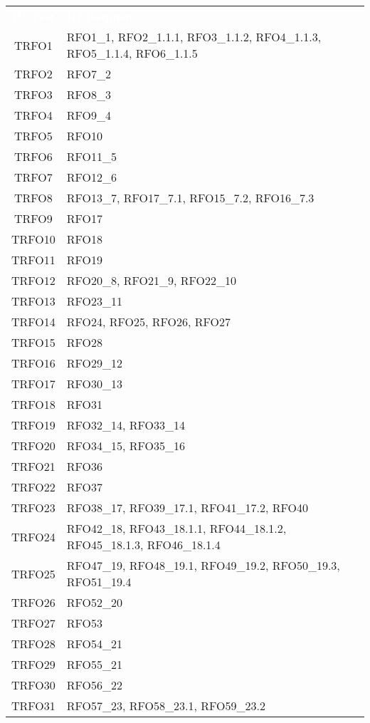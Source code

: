 \begin{longtable}{|c| C{13cm}|}
	\textcolor{white}{\textbf{ID Test}}&
	\textcolor{white}{\textbf{ID Requisito}}\label{tab:TestSistema2}\\
	TRFO1 & RFO1\_1, RFO2\_1.1.1, RFO3\_1.1.2, RFO4\_1.1.3, RFO5\_1.1.4, RFO6\_1.1.5\\ \hline
	TRFO2 & RFO7\_2\\ \hline
	TRFO3 & RFO8\_3\\ \hline
	TRFO4 & RFO9\_4\\ \hline
	TRFO5 & RFO10\\ \hline
	TRFO6 & RFO11\_5\\ \hline
	TRFO7 & RFO12\_6\\ \hline
	TRFO8 & RFO13\_7, RFO17\_7.1, RFO15\_7.2, RFO16\_7.3\\ \hline
	TRFO9 & RFO17\\ \hline
	TRFO10 & RFO18\\ \hline
	TRFO11 & RFO19\\ \hline
	TRFO12 & RFO20\_8, RFO21\_9, RFO22\_10\\ \hline
	TRFO13 & RFO23\_11\\ \hline
	TRFO14 & RFO24, RFO25, RFO26, RFO27\\ \hline
	TRFO15 & RFO28\\ \hline
	TRFO16 & RFO29\_12\\ \hline
	TRFO17 & RFO30\_13\\ \hline
	TRFO18 & RFO31\\ \hline
	TRFO19 & RFO32\_14, RFO33\_14\\ \hline
	TRFO20 & RFO34\_15, RFO35\_16\\ \hline
	TRFO21 & RFO36\\ \hline
	TRFO22 & RFO37\\ \hline
	TRFO23 & RFO38\_17, RFO39\_17.1, RFO41\_17.2, RFO40\\ \hline
	TRFO24 & RFO42\_18, RFO43\_18.1.1, RFO44\_18.1.2, RFO45\_18.1.3, RFO46\_18.1.4\\ \hline
	TRFO25 & RFO47\_19, RFO48\_19.1, RFO49\_19.2, RFO50\_19.3, RFO51\_19.4\\ \hline
	TRFO26 & RFO52\_20\\ \hline
	TRFO27 & RFO53\\ \hline
	TRFO28 & RFO54\_21\\ \hline
	TRFO29 & RFO55\_21\\ \hline
	TRFO30 & RFO56\_22\\ \hline
	TRFO31 & RFO57\_23, RFO58\_23.1, RFO59\_23.2\\ \hline

\end{longtable}
